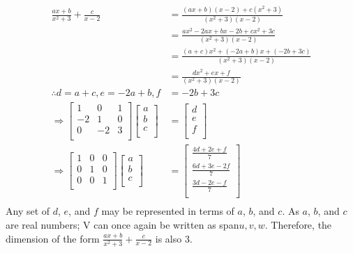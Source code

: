 \documentclass[10pt]{article}
\begin{document}
{{		\begin{align}
			\frac{ax+b}{x^2+3}+\frac{c}{x-2} &= \frac{(ax+b)(x-2)+c(x^2+3)}{(x^2+3)(x-2)} \\
			&= \frac{ax^2-2ax+bx-2b+cx^2+3c}{(x^2+3)(x-2)} \\
			&= \frac{(a+c)x^2+(-2a+b)x+(-2b+3c)}{(x^2+3)(x-2)} \\
			&= \frac{dx^2+ex+f}{(x^2+3)(x-2)} \\
			\therefore d = a+c, e = -2a+b, f &= -2b+3c \\
			\Rightarrow 
			\begin{bmatrix}
				1 & 0 & 1 \\
				-2 & 1 & 0 \\
				0 & -2 & 3 \\
			\end{bmatrix}
			\begin{bmatrix}
				a \\
				b \\
				c \\
			\end{bmatrix}
			&=
			\begin{bmatrix}
				d \\
				e \\
				f \\
			\end{bmatrix} \\
			\Rightarrow
			\begin{bmatrix}
				1 & 0 & 0 \\
				0 & 1 & 0 \\
				0 & 0 & 1 \\
			\end{bmatrix}
			\begin{bmatrix}
				a \\
				b \\
				c \\
			\end{bmatrix}
			&=
			\begin{bmatrix}
				\frac{4d + 2e + f}{7} \\
				\frac{6d + 3e - 2f}{7} \\
				\frac{3d - 2e - f}{7} \\
			\end{bmatrix} \\
		\end{align}
  		Any set of $d$, $e$, and $f$ may be represented in terms of $a$, $b$, and $c$. As $a$, $b$, and $c$ 
    		are real numbers; V can once again be written as span{$u,v,w$}. Therefore, the dimension of the form $\frac{ax + b}{x^{2}+3}+\frac{c}{x-2}$ 
      		is also 3.
	}
}
\end{document}
